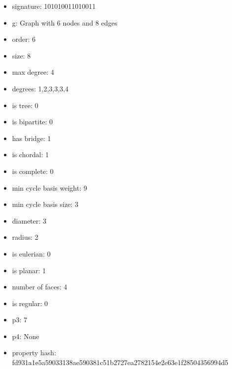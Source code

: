 \begin{itemize}
\item signature: 101010011010011
\item g: Graph with 6 nodes and 8 edges
\item order: 6
\item size: 8
\item max degree: 4
\item degrees: 1,2,3,3,3,4
\item is tree: 0
\item is bipartite: 0
\item has bridge: 1
\item is chordal: 1
\item is complete: 0
\item min cycle basis weight: 9
\item min cycle basis size: 3
\item diameter: 3
\item radius: 2
\item is eulerian: 0
\item is planar: 1
\item number of faces: 4
\item is regular: 0
\item p3: 7
\item p4: None
\item property hash: fd931a1e5a59033138ae590381c51b2727ea2782154e2e63e1f28504356994d5
\end{itemize}
\newpage
